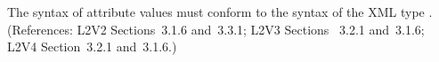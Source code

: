 The syntax of  attribute values must conform to the syntax of the
XML type .  (References: L2V2 Sections~3.1.6 and~3.3.1;
L2V3 Sections ~3.2.1 and~3.1.6; L2V4 Section~3.2.1 and~3.1.6.)
